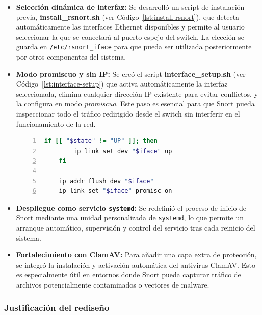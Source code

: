 \documentclass[11pt,a4paper,twoside]{report}
\begin{document}
\begin{itemize}
	\item \textbf{Selección dinámica de interfaz:} Se desarrolló un script de instalación previa, \textbf{install\_rsnort.sh} (ver Código~\ref{lst:install-rsnort}), que detecta automáticamente las interfaces Ethernet disponibles y permite al usuario seleccionar la que se conectará al puerto espejo del switch. La elección se guarda en \texttt{/etc/rsnort\_iface} para que pueda ser utilizada posteriormente por otros componentes del sistema.
	
	\item \textbf{Modo promiscuo y sin IP:} Se creó el script \textbf{interface\_setup.sh} (ver Código~\ref{lst:interface-setup}) que activa automáticamente la interfaz seleccionada, elimina cualquier dirección IP existente para evitar conflictos, y la configura en modo \textit{promiscuo}. Este paso es esencial para que Snort pueda inspeccionar todo el tráfico redirigido desde el switch sin interferir en el funcionamiento de la red.
	
	\begin{lstlisting}[language=bash, caption={Activación automática del modo promiscuo en interface\_setup.sh}, label=lst:promiscuo, basicstyle=\ttfamily\footnotesize, frame=single, numbers=left, numberstyle=\tiny, breaklines=true]
	if [[ "$state" != "UP" ]]; then
		ip link set dev "$iface" up
	fi
	
	ip addr flush dev "$iface"
	ip link set "$iface" promisc on
	\end{lstlisting}
	
	\item \textbf{Despliegue como servicio \texttt{systemd}:} Se redefinió el proceso de inicio de Snort mediante una unidad personalizada de \texttt{systemd}, lo que permite un arranque automático, supervisión y control del servicio tras cada reinicio del sistema.
	
	\item \textbf{Fortalecimiento con ClamAV:} Para añadir una capa extra de protección, se integró la instalación y activación automática del antivirus ClamAV. Esto es especialmente útil en entornos donde Snort pueda capturar tráfico de archivos potencialmente contaminados o vectores de malware.
\end{itemize}

\subsubsection{Justificación del rediseño}
\end{document}
